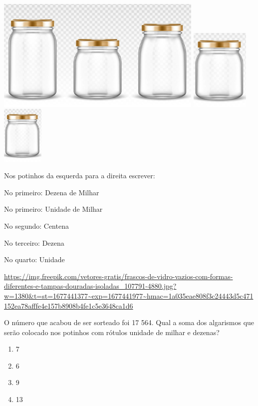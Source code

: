 \includegraphics[width=3.90833in,height=2.14168in]{media/image163.png}
\includegraphics[width=1.10010in,height=1.54180in]{media/image164.png}\includegraphics[width=0.78333in,height=1.09785in]{media/image164.png}

Nos potinhos da esquerda para a direita escrever:

No primeiro: Dezena de Milhar

No primeiro: Unidade de Milhar

No segundo: Centena

No terceiro: Dezena

No quarto: Unidade

\url{https://img.freepik.com/vetores-gratis/frascos-de-vidro-vazios-com-formas-diferentes-e-tampas-douradas-isoladas_107791-4880.jpg?w=1380\&t=st=1677441377~exp=1677441977~hmac=1a035eae808f3c24443d5c471152ea78afffe4e157b8908b4fe1c5e3648ca1d6}

O número que acabou de ser sorteado foi 17 564. Qual a soma dos
algarismos que serão colocado nos potinhos com rótulos unidade de milhar
e dezenas?

\begin{enumerate}
\def\labelenumi{\alph{enumi})}
\item
  7
\item
  6
\item
  9
\item
  13
\end{enumerate}

